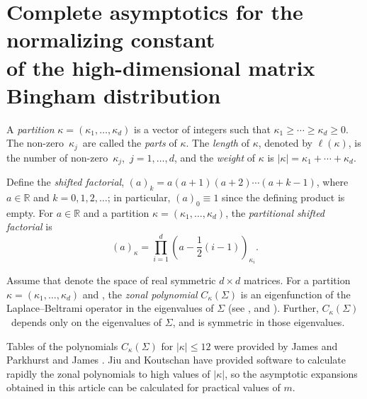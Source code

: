 \section[Complete asymptotics for the normalizing constant of the high-dimensional matrix Bingham distribution]{Complete asymptotics for the normalizing constant\\ of the high-dimensional matrix Bingham distribution}
\label{sec_matrix_bingham}

A \textit{partition} $\kappa = (\kappa_1,\ldots,\kappa_d)$ is a vector of integers such that $\kappa_1 \ge \cdots \ge \kappa_d \ge 0$. The non-zero~$\kappa_j$~are called the \textit{parts} of $\kappa$. The \textit{length} of $\kappa$, denoted by $\ell(\kappa)$, is the number of non-zero~$\kappa_j$,~$j=1,\ldots,d$, and the \textit{weight} of $\kappa$ is $|\kappa| = \kappa_1+\cdots+\kappa_d$.

Define the \textit{shifted factorial}, $(a)_k = a(a+1)(a+2) \cdots (a+k-1)$, where $a \in \mathbb{R}$ and ${k=0,1,2,\ldots}$; in particular, $(a)_0 \equiv 1$ since the defining product is empty. For $a \in \mathbb{R}$ and a partition ${\kappa = (\kappa_1,\ldots,\kappa_d)}$, the {\it partitional shifted factorial} is %
\begin{equation}
\label{eq_partit_fact}
(a)_\kappa = \prod_{i=1}^d \left(a-\frac{1}{2}(i-1)\right)_{\kappa_i}.
\end{equation}

Assume that  denote the space of real symmetric $d \times d$ matrices. For a partition $\kappa = (\kappa_1,\ldots,\kappa_d)$ and , the \textit{zonal polynomial} $C_\kappa(\Sigma)$ is an eigenfunction of the Laplace--Beltrami operator in the eigenvalues of $\Sigma$ (see \cite{James68}, \cite[Chapter 7]{Muirhead} and \cite{Richards10}). Further, $C_\kappa(\Sigma)$~depends only on the eigenvalues of $\Sigma$, and is symmetric in those eigenvalues.

Tables of the polynomials $C_\kappa(\Sigma)$ for $|\kappa| \le 12$ were provided by James \cite[pp.~498--499]{James64} and Parkhurst and James \cite{ParkhurstJames}. Jiu and Koutschan \cite{JiuKoutschan} have provided software to calculate rapidly the zonal polynomials to high values of $|\kappa|$, so the asymptotic expansions obtained in this article can be calculated for practical values of $m$.

